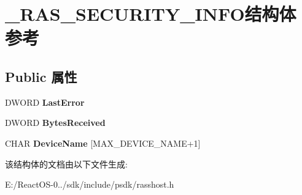 \hypertarget{struct___r_a_s___s_e_c_u_r_i_t_y___i_n_f_o}{}\section{\+\_\+\+R\+A\+S\+\_\+\+S\+E\+C\+U\+R\+I\+T\+Y\+\_\+\+I\+N\+F\+O结构体 参考}
\label{struct___r_a_s___s_e_c_u_r_i_t_y___i_n_f_o}
\subsection*{Public 属性}
\begin{DoxyCompactItemize}
\item 
\mbox{\label{struct___r_a_s___s_e_c_u_r_i_t_y___i_n_f_o_a3fd670b18b497493bb29f7896186f309}} 
D\+W\+O\+RD {\bfseries Last\+Error}
\item 
\mbox{\label{struct___r_a_s___s_e_c_u_r_i_t_y___i_n_f_o_a833f45d5d0682ea9cf0407437ef3168f}} 
D\+W\+O\+RD {\bfseries Bytes\+Received}
\item 
\mbox{\label{struct___r_a_s___s_e_c_u_r_i_t_y___i_n_f_o_a922f24604425c1fccfb5477bfb886f19}} 
C\+H\+AR {\bfseries Device\+Name} \mbox{[}M\+A\+X\+\_\+\+D\+E\+V\+I\+C\+E\+\_\+\+N\+A\+ME+1\mbox{]}
\end{DoxyCompactItemize}


该结构体的文档由以下文件生成\+:\begin{DoxyCompactItemize}
\item 
E\+:/\+React\+O\+S-\/0../sdk/include/psdk/rasshost.\+h\end{DoxyCompactItemize}
